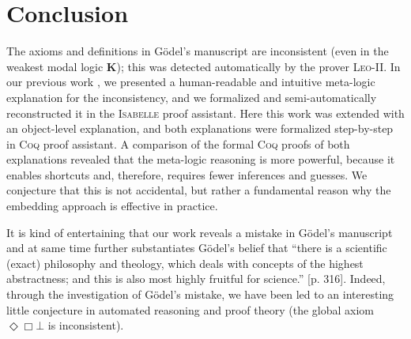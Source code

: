 \documentclass{llncs}
\newcommand{\logic}[1]{\textbf{#1}\xspace}
\newcommand{\K}{\logic{K}}
\newcommand{\Dia}{\Diamond} %
\newcommand{\nec}{\Box}
\newcommand{\pos}{\Dia}
\begin{document}
\section{Conclusion}\label{sec:conclusion}


The axioms and definitions in G\"odel's manuscript are inconsistent (even in the weakest modal logic \K);
this was detected automatically by the prover
\textsc{Leo-II}. In our previous work \cite{C55}, we presented a human-readable and intuitive meta-logic explanation for the inconsistency, and we formalized and semi-automatically reconstructed it in the \textsc{Isabelle} proof assistant. Here this work was extended with an object-level explanation, and both explanations were formalized step-by-step in \textsc{Coq} proof assistant. A comparison of the formal \textsc{Coq} proofs of both explanations revealed that the meta-logic reasoning is more powerful, because it enables shortcuts and, therefore, requires fewer inferences and guesses. We conjecture that this is not accidental, but rather a fundamental reason why the embedding approach is effective in practice. 

It is kind of entertaining that our work reveals a mistake in
G\"odel's manuscript and at same time further substantiates G\"odel's
belief that ``there is a scientific (exact) philosophy and theology,
which deals with concepts of the highest abstractness; and this is
also most highly fruitful for science.''
\cite{Wang1996}[p. 316]. Indeed, through the investigation of
G\"odel's mistake, we have been led to an interesting little
conjecture in automated reasoning and proof theory (the global axiom
$\pos \nec \bot$ is inconsistent).
\end{document}
